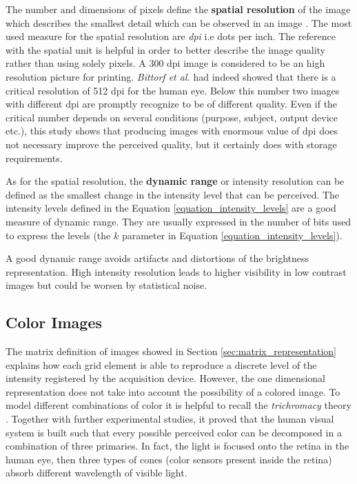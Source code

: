 \documentclass[../main.tex]{subfiles}
\begin{document}
The number and dimensions of pixels define the \textbf{spatial resolution} of the image which describes the smallest detail which can be observed in an image \cite{digital_image_processing_gonzales}. The most used measure for the spatial resolution are \textit{dpi} i.e dots per inch. The reference with the spatial unit is helpful in order to better describe the image quality rather than using solely pixels.
A 300 dpi image is considered to be an high resolution picture for printing. \textit{Bittorf et al.} \cite{resolution_requirements} had indeed showed that there is a critical resolution of 512 dpi for the human eye. Below this number two images with different dpi are promptly recognize to be of different quality. Even if the critical number depends on several conditions (purpose, subject, output device etc.), this study shows that producing images with enormous value of dpi does not necessary improve the perceived quality, but it certainly does with storage requirements.
 
As for the spatial resolution, the \textbf{dynamic range} or intensity resolution can be defined as the smallest change in the intensity level that can be perceived\cite{digital_image_processing_gonzales}. The intensity levels defined in the Equation \ref{equation_intensity_levels} are a good measure of dynamic range. They are usually expressed in the number of bits used to express the levels (the $k$ parameter in Equation \ref{equation_intensity_levels}). 

A good dynamic range avoids artifacts and distortions of the brightness representation. High intensity resolution leads to higher visibility in low contrast images but could be worsen by statistical noise.

\subsection{Color Images}\label{sec:color-images}

The matrix definition of images showed in Section \ref{sec:matrix_representation} explains how each grid element is able to reproduce a discrete level of the intensity registered by the acquisition device. However, the one dimensional representation does not take into account the possibility of a colored image.
To model different combinations of color it is helpful to recall the \textit{trichromacy} theory \cite{young}. Together with further experimental studies, it proved that the human visual system is built such that every possible perceived color can be decomposed in a combination of three primaries. In fact, the light is focused onto the retina in the human eye, then three types of cones (color sensors present inside the retina) absorb different wavelength of visible light.
\end{document}
